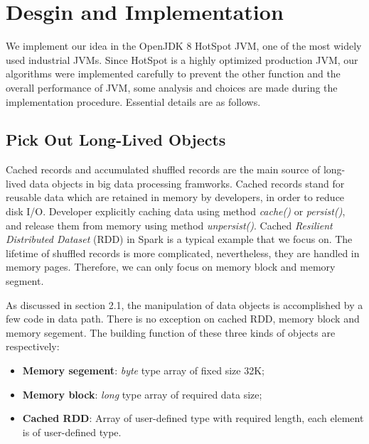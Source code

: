 \documentclass[sigplan, screen]{acmart}
\begin{document}
\section{Desgin and Implementation}
  We implement our idea in the OpenJDK 8 HotSpot JVM, one of the most widely used industrial JVMs. Since HotSpot is a highly optimized production JVM, our algorithms were implemented carefully
to prevent the other function and the overall performance of JVM, some analysis and choices are made during the implementation procedure. Essential details are as follows.

\subsection{Pick Out Long-Lived Objects}
  Cached records and accumulated shuffled records are the main source of long-lived data objects in big data processing framworks\cite{xu2019experimental}. Cached records stand for
reusable data which are retained in memory by developers, in order to reduce disk I/O. Developer explicitly caching data using method \emph{cache()} or \emph{persist()}, and release them 
from memory using method \emph{unpersist()}. Cached \emph{Resilient Distributed Dataset} (RDD) in Spark is a typical example that we focus on. The lifetime of shuffled records
is more complicated, nevertheless, they are handled in memory pages. Therefore, we can only focus on memory block and memory segment.

As discussed in section 2.1, the manipulation of data objects is accomplished by a few code in data path. There is no exception on cached RDD, memory block and memory segement.
The building function of these three kinds of objects are respectively:  
\begin{itemize}
  \item \textbf{Memory segement}: \emph{byte} type array of fixed size 32K;
  \item \textbf{Memory block}: \emph{long} type array of required data size;
  \item \textbf{Cached RDD}: Array of user-defined type with required length, each element is of user-defined type.
\end{itemize}
\end{document}
